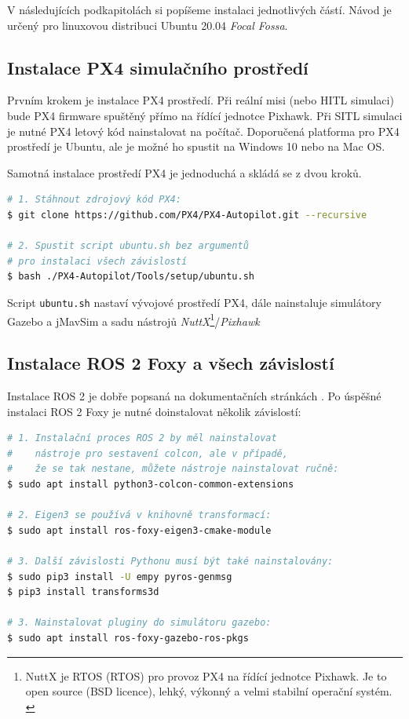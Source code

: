 V následujících podkapitolách si popíšeme instalaci jednotlivých částí. Návod je určený pro linuxovou distribuci Ubuntu 20.04 \textit{Focal Fossa}.

\subsection{Instalace PX4 simulačního prostředí}

Prvním krokem je instalace PX4 prostředí. Při reální misi (nebo \acs{HITL} simulaci) bude PX4 firmware spuštěný přímo na řídící jednotce Pixhawk. Při \acs{SITL} simulaci je nutné PX4 letový kód nainstalovat na počítač. Doporučená platforma pro PX4 prostředí je Ubuntu, ale je možné ho spustit na Windows 10 nebo na Mac OS.

Samotná instalace prostředí PX4 je jednoduchá a skládá se z dvou kroků. \cite{PX4docs}

\begin{lstlisting}[language=bash]
# 1. Stáhnout zdrojový kód PX4:
$ git clone https://github.com/PX4/PX4-Autopilot.git --recursive
 
# 2. Spustit script ubuntu.sh bez argumentů
# pro instalaci všech závislostí
$ bash ./PX4-Autopilot/Tools/setup/ubuntu.sh
\end{lstlisting}

Script \texttt{ubuntu.sh} nastaví vývojové prostředí PX4, dále nainstaluje simulátory Gazebo a jMavSim a sadu nástrojů \textit{NuttX}\footnote{NuttX je \acs{RTOS} (\acl{RTOS}) pro provoz PX4 na řídící jednotce Pixhawk. Je to open source (BSD licence), lehký, výkonný a velmi stabilní operační systém. \cite{PX4docs}}/\textit{Pixhawk}

\subsection{Instalace ROS 2 Foxy a všech závislostí}

Instalace ROS 2 je dobře popsaná na dokumentačních stránkách \cite{ROS2INSTALL}. Po úspěšné instalaci ROS 2 Foxy je nutné doinstalovat několik závislostí:

\begin{lstlisting}[language=bash]
# 1. Instalační proces ROS 2 by měl nainstalovat 
#    nástroje pro sestavení colcon, ale v případě, 
#    že se tak nestane, můžete nástroje nainstalovat ručně:
$ sudo apt install python3-colcon-common-extensions
 
# 2. Eigen3 se používá v knihovně transformací:
$ sudo apt install ros-foxy-eigen3-cmake-module
 
# 3. Další závislosti Pythonu musí být také nainstalovány:
$ sudo pip3 install -U empy pyros-genmsg 
$ pip3 install transforms3d

# 3. Nainstalovat pluginy do simulátoru gazebo:
$ sudo apt install ros-foxy-gazebo-ros-pkgs
\end{lstlisting}

